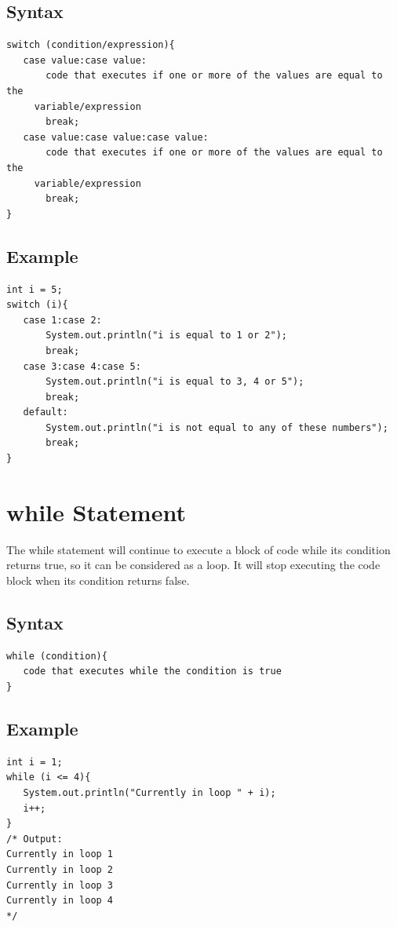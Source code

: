 \documentclass[a4paper]{article}
\begin{document}
\newpage

\subsection*{Syntax}
\begin{lstlisting}
switch (condition/expression){
   case value:case value:
       code that executes if one or more of the values are equal to the
     variable/expression
       break;
   case value:case value:case value:
       code that executes if one or more of the values are equal to the
     variable/expression
       break;
}
\end{lstlisting}

\subsection*{Example}
\begin{lstlisting}
int i = 5;
switch (i){
   case 1:case 2:
       System.out.println("i is equal to 1 or 2");
       break;
   case 3:case 4:case 5:
       System.out.println("i is equal to 3, 4 or 5");
       break;
   default:
       System.out.println("i is not equal to any of these numbers");
       break;
}
\end{lstlisting}

\section*{while Statement}
The while statement will continue to execute a block of code while its condition
returns true, so it can be considered as a loop. It will stop executing the code
block when its condition returns false.

\subsection*{Syntax}
\begin{lstlisting}
while (condition){
   code that executes while the condition is true
}
\end{lstlisting}

\newpage

\subsection*{Example}
\begin{lstlisting}
int i = 1;
while (i <= 4){
   System.out.println("Currently in loop " + i);
   i++;
}
/* Output:
Currently in loop 1
Currently in loop 2
Currently in loop 3
Currently in loop 4
*/

\end{lstlisting}
\end{document}
